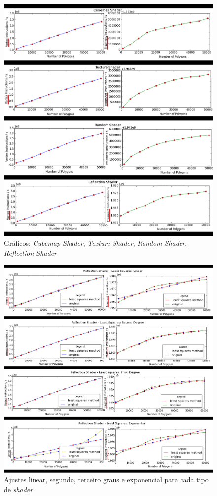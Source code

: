  
	\begin{figure}[ht]
	\centering
		\includegraphics[keepaspectratio=true,scale=0.55]{figuras/cubeplot.png}
	\caption{Gráficos: \textit{Cubemap Shader}, \textit{Texture Shader}, \textit{Random Shader}, \textit{Reflection Shader}}
	\label{plotrefl}
	\end{figure}


	\begin{figure}[ht]
	\centering
		\includegraphics[keepaspectratio=true,scale=0.4]{figuras/reflectionlinear.png}
	\caption{Ajustes linear, segundo, terceiro graus e exponencial para cada tipo de \textit{shader}}
	\label{linear}
	\end{figure}	

